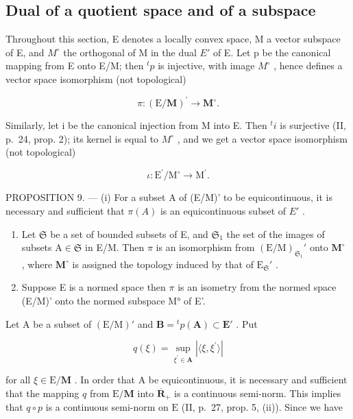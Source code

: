 \subsection{Dual of a quotient space and of a subspace}

Throughout this section, E denotes a locally convex space, M a vector subspace of E, and \(M^{\circ}\) the orthogonal of M in the dual \(E'\) of E. Let p be the canonical mapping from E onto E/M; then \(^{t}p\) is injective, with image \(M^{\circ}\) , hence defines a vector space isomorphism (not topological)

\[
\pi : (\mathrm{E} / \mathbf {M}) ^ {\prime} \rightarrow \mathbf {M} ^ {\circ}.
\]

Similarly, let i be the canonical injection from M into E. Then \({}^{t}i\) is surjective (II, p.~24, prop. 2); its kernel is equal to \(M^{\circ}\) , and we get a vector space isomorphism (not topological)

\[
\iota : \mathrm{E} ^ {\prime} / \mathrm{M} ^ {\circ} \rightarrow \mathrm{M} ^ {\prime}.
\]

PROPOSITION 9. --- (i) For a subset A of (E/M)' to be equicontinuous, it is necessary and sufficient that \(\pi(A)\) is an equicontinuous subset of \(E'\) .

\begin{enumerate}
\def\labelenumi{(\roman{enumi})}
\setcounter{enumi}{1}
\item
  Let \(\mathfrak{S}\) be a set of bounded subsets of E, and \(\mathfrak{S}_1\) the set of the images of subsets \(\mathrm{A} \in \mathfrak{S}\) in E/M. Then \(\pi\) is an isomorphism from \((\mathrm{E} / \mathrm{M})_{\mathfrak{S}_1}'\) onto \(\mathbf{M}^\circ\) , where \(\mathbf{M}^\circ\) is assigned the topology induced by that of \(\mathrm{E}_{\mathfrak{S}}'\) .
\item
  Suppose E is a normed space then \(\pi\) is an isometry from the normed space (E/M)' onto the normed subspace M° of E'.
\end{enumerate}

Let A be a subset of \((\mathrm{E}/\mathrm{M})'\) and \(\mathbf{B} = {}^{t}p(\mathbf{A}) \subset \mathbf{E}'\) . Put

\[
q (\xi) = \sup _ {\xi^ {\prime} \in \mathbf {A}} | \langle \xi , \xi^ {\prime} \rangle |
\]

for all \(\xi \in \mathrm{E} / \mathbf{M}\) . In order that A be equicontinuous, it is necessary and sufficient that the mapping \(q\) from \(\mathrm{E} / \mathbf{M}\) into \(\overline{\mathbf{R}}_+\) is a continuous semi-norm. This implies that \(q \circ p\) is a continuous semi-norm on \(\mathrm{E}\) (II, p.~27, prop. 5, (ii)). Since we have

